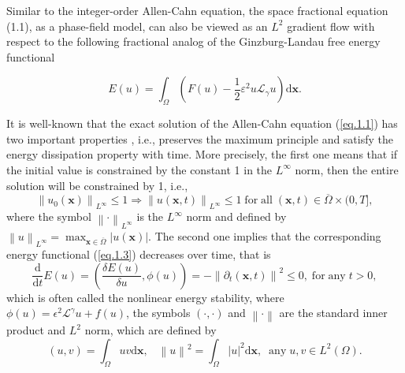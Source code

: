 \documentclass{siamart171218}
\numberwithin{theorem}{section}
\numberwithin{equation}{section}
\newcommand{\vecx}{\boldsymbol{x}}
\begin{document}
Similar to the integer-order Allen-Cahn equation,
the space fractional equation (1.1), as a phase-field model,
can also be viewed as an $L^2$ gradient flow with respect
to the following fractional analog of the
Ginzburg-Landau free energy functional

\begin{equation}\label{eq.1.3}
\displaystyle
E\left(u\right)=\int_{\Omega}\left(F\left(u\right)-
\frac{1}{2}\varepsilon^2u\mathcal{L}_{\gamma}u\right)
\mathrm{d}\vecx.
\end{equation}

It is well-known that the exact solution of the Allen-Cahn equation (\ref{eq.1.1})
has two important properties \cite{Hou2017}, i.e.,
preserves the maximum principle
and satisfy the energy dissipation property with time. More precisely, the first one means that
if the initial value is constrained by the constant 1 in the $L^\infty$ norm,
then the entire solution will be constrained by 1, i.e.,
$$\left\|u_0(\vecx)\right\|_{L^\infty}\leq1
\Rightarrow\left\|u(\vecx,t)\right\|_{L^\infty}\leq1
\;\mathrm{for}\;\mathrm{all}\;(\vecx,t)\in\overline{\Omega}\times(0,T],$$
where the symbol $\left\|\cdot\right\|_{L^\infty}$ is the $L^\infty$ norm and
defined by
$
\left\|u\right\|_{L^\infty}=\max_{\vecx\in\overline{\Omega}}
\left|u(\vecx)\right|.$
The second one implies that the corresponding
energy functional (\ref{eq.1.3}) decreases over time, that is
\begin{equation*}
\displaystyle
\frac{\mathrm{d}}{\mathrm{d}t}E\left(u\right)=
\left(\frac{\delta E(u)}{\delta u},\phi(u)\right)
=-\left\|\partial_t\left(\vecx,t\right)\right\|^2
\leq0,\;\mathrm{for}\;\mathrm{any}\;t>0,
\end{equation*}
which is often called the nonlinear energy stability,
where $\phi(u)=\epsilon^2\mathscr{L}^\gamma u+f(u)$,
the symbols $(\cdot, \cdot)$ and $\left\|\cdot\right\|$ are the standard inner
product and $L^2$ norm, which are defined by
\begin{equation*}
\displaystyle
\left(u,v\right)=\int_{\Omega}uv\mathrm{d}\vecx,\;
\;\;
\left\|u\right\|^2=\int_{\Omega}\left|u\right|^2\mathrm{d}\vecx,\;\;
\mathrm{any}\;u,v\in L^2(\Omega).
\end{equation*}
\end{document}
